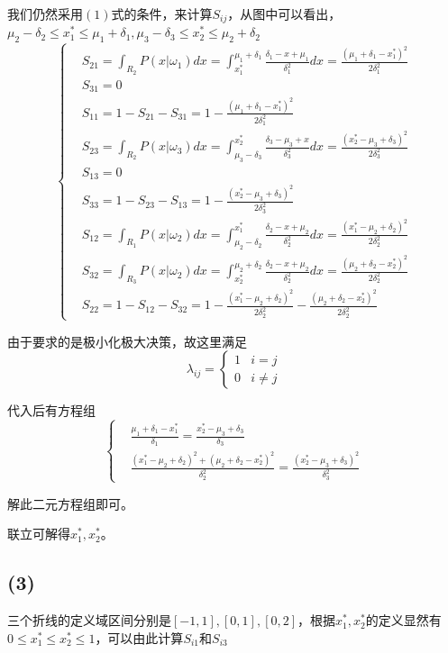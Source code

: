 \documentclass{ctexart}
\begin{document}
我们仍然采用$(1)$式的条件，来计算$S_{ij}$，从图中可以看出，$\mu_2-\delta_2 \le x_1^* \le \mu_1+\delta_1,\mu_3-\delta_3 \le x_2^* \le \mu_2+\delta_2$
\[
\begin{cases}
&S_{21}=\int_{R_2}P(x|\omega_1)dx=\int_{x_1^*}^{\mu_1+\delta_1}\frac{\delta_1-x+\mu_1}{\delta_1^2}dx=\frac{(\mu_1+\delta_1-x_1^*)^2}{2\delta_1^2}\\
&S_{31}=0\\
&S_{11}=1-S_{21}-S_{31}=1-\frac{(\mu_1+\delta_1-x_1^*)^2}{2\delta_1^2}\\
&S_{23}=\int_{R_2}P(x|\omega_3)dx=\int_{\mu_3-\delta_3}^{x_2^*}\frac{\delta_3-\mu_3+x}{\delta_3^2}dx=\frac{(x_2^*-\mu_3+\delta_3)^2}{2\delta_3^2}\\
&S_{13}=0\\
&S_{33}=1-S_{23}-S_{13}=1-\frac{(x_2^*-\mu_3+\delta_3)^2}{2\delta_3^2}\\
&S_{12}=\int_{R_1}P(x|\omega_2)dx=\int_{\mu_2-\delta_2}^{x_1^*}\frac{\delta_2-x+\mu_2}{\delta_2^2}dx=\frac{(x_1^*-\mu_2+\delta_2)^2}{2\delta_2^2}\\
&S_{32}=\int_{R_3}P(x|\omega_2)dx=\int_{x_2^*}^{\mu_2+\delta_2}\frac{\delta_2-x+\mu_2}{\delta_2^2}dx=\frac{(\mu_2+\delta_2-x_2^*)^2}{2\delta_2^2}\\
&S_{22}=1-S_{12}-S_{32}=1-\frac{(x_1^*-\mu_2+\delta_2)^2}{2\delta_2^2}-\frac{(\mu_2+\delta_2-x_2^*)^2}{2\delta_2^2}
\end{cases}
\]

由于要求的是极小化极大决策，故这里满足
\[
\lambda_{ij}=
\begin{cases}
1 & i=j \\
0 & i \neq j
\end{cases}
\]

代入后有方程组
\[\begin{cases}
&\frac{\mu_1+\delta_1-x_1^*}{\delta_1}=\frac{x_2^*-\mu_3+\delta_3}{\delta_3}\\
&\frac{(x_1^*-\mu_2+\delta_2)^2+(\mu_2+\delta_2-x_2^*)^2}{\delta_2^2}=\frac{(x_2^*-\mu_3+\delta_3)^2}{\delta_3^2}
\end{cases}\]

解此二元方程组即可。

联立可解得$x_1^*,x_2^*$。
\subsection*{(3)}
三个折线的定义域区间分别是$[-1,1],[0,1],[0,2]$，根据$x_1^*,x_2^*$的定义显然有$0 \le x_1^* \le x_2^* \le 1$，可以由此计算$S_{i1}$和$S_{i3}$
\end{document}
